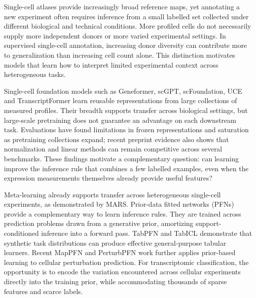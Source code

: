 Single-cell atlases provide increasingly broad reference maps, yet annotating a new experiment often requires inference from a small labelled set collected under different biological and technical conditions. More profiled cells do not necessarily supply more independent donors or more varied experimental settings. In supervised single-cell annotation, increasing donor diversity can contribute more to generalization than increasing cell count alone\cite{fischer2024sctab}. This distinction motivates models that learn how to interpret limited experimental context across heterogeneous tasks.

Single-cell foundation models such as Geneformer, scGPT, scFoundation, UCE and TranscriptFormer learn reusable representations from large collections of measured profiles\cite{theodoris2023geneformer,cui2024scgpt,hao2024scfoundation,rosen2026uce,pearce2026transcriptformer}. Their breadth supports transfer across biological settings, but large-scale pretraining does not guarantee an advantage on each downstream task. Evaluations have found limitations in frozen representations and saturation as pretraining collections expand\cite{kedzierska2025zeroshot,denadel2026scaling}; recent preprint evidence also shows that normalization and linear methods can remain competitive across several benchmarks\cite{souza2026parameterfree}. These findings motivate a complementary question: can learning improve the inference rule that combines a few labelled examples, even when the expression measurements themselves already provide useful features?

Meta-learning already supports transfer across heterogeneous single-cell experiments, as demonstrated by MARS\cite{brbic2020mars}. Prior-data fitted networks (PFNs) provide a complementary way to learn inference rules. They are trained across prediction problems drawn from a generative prior, amortizing support-conditioned inference into a forward pass\cite{muller2022pfn}. TabPFN and TabICL demonstrate that synthetic task distributions can produce effective general-purpose tabular learners\cite{hollmann2023tabpfn,hollmann2025tabpfn,qu2025tabicl,qu2026tabiclv2}. Recent MapPFN and PerturbPFN work further applies prior-based learning to cellular perturbation prediction\cite{sextro2026mappfn,gao2026perturbpfn}. For transcriptomic classification, the opportunity is to encode the variation encountered across cellular experiments directly into the training prior, while accommodating thousands of sparse features and scarce labels.

